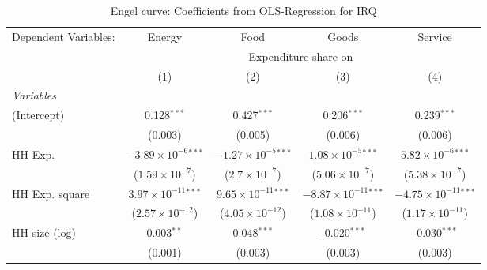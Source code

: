 
\begin{table}[htbp!]
   \centering
   \small
   \begin{adjustbox}{width = 1\textwidth, max height = 0.95\textheight, center}
      \begin{threeparttable}[b]
         \caption{\label{tab:Engel_parametric_IRQ} Engel curve: Coefficients from OLS-Regression for IRQ}
         \begin{tabular}{lcccc}
            \tabularnewline \midrule \midrule
            Dependent Variables: & Energy                         & Food                           & Goods                           & Service\\  
             & \multicolumn{4}{c}{Expenditure share on} \\ 
                                 & (1)                            & (2)                            & (3)                             & (4)\\  
            \midrule
            \emph{Variables}\\
            (Intercept)          & 0.128$^{***}$                  & 0.427$^{***}$                  & 0.206$^{***}$                   & 0.239$^{***}$\\   
                                 & (0.003)                        & (0.005)                        & (0.006)                         & (0.006)\\   
            HH Exp.              & $-3.89\times 10^{-6}$$^{***}$  & $-1.27\times 10^{-5}$$^{***}$  & $1.08\times 10^{-5}$$^{***}$    & $5.82\times 10^{-6}$$^{***}$\\    
                                 & ($1.59\times 10^{-7}$)         & ($2.7\times 10^{-7}$)          & ($5.06\times 10^{-7}$)          & ($5.38\times 10^{-7}$)\\    
            HH Exp. square       & $3.97\times 10^{-11}$$^{***}$  & $9.65\times 10^{-11}$$^{***}$  & $-8.87\times 10^{-11}$$^{***}$  & $-4.75\times 10^{-11}$$^{***}$\\    
                                 & ($2.57\times 10^{-12}$)        & ($4.05\times 10^{-12}$)        & ($1.08\times 10^{-11}$)         & ($1.17\times 10^{-11}$)\\    
            HH size (log)        & 0.003$^{**}$                   & 0.048$^{***}$                  & -0.020$^{***}$                  & -0.030$^{***}$\\   
                                 & (0.001)                        & (0.003)                        & (0.003)                         & (0.003)\\   

\end{tabular}
\end{threeparttable}
\end{adjustbox}
\end{table}
